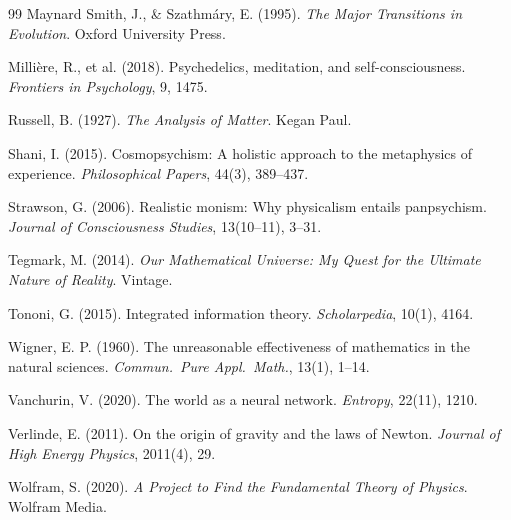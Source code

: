 \documentclass[11pt,a4paper]{article}
\theoremstyle{definition}
\theoremstyle{plain}
\theoremstyle{remark}
\begin{document}
\begin{thebibliography}{99}
 Maynard Smith, J., \& Szathm\'ary, E. (1995). \textit{The Major Transitions in Evolution}. Oxford University Press.

 Milli\`ere, R., et al. (2018). Psychedelics, meditation, and self-consciousness. \textit{Frontiers in Psychology}, 9, 1475.

 Russell, B. (1927). \textit{The Analysis of Matter}. Kegan Paul.

 Shani, I. (2015). Cosmopsychism: A holistic approach to the metaphysics of experience. \textit{Philosophical Papers}, 44(3), 389--437.

 Strawson, G. (2006). Realistic monism: Why physicalism entails panpsychism. \textit{Journal of Consciousness Studies}, 13(10--11), 3--31.

 Tegmark, M. (2014). \textit{Our Mathematical Universe: My Quest for the Ultimate Nature of Reality}. Vintage.

 Tononi, G. (2015). Integrated information theory. \textit{Scholarpedia}, 10(1), 4164.

 Wigner, E. P. (1960). The unreasonable effectiveness of mathematics in the natural sciences. \textit{Commun.\ Pure Appl.\ Math.}, 13(1), 1--14.

 Vanchurin, V. (2020). The world as a neural network. \textit{Entropy}, 22(11), 1210.

 Verlinde, E. (2011). On the origin of gravity and the laws of Newton. \textit{Journal of High Energy Physics}, 2011(4), 29.

 Wolfram, S. (2020). \textit{A Project to Find the Fundamental Theory of Physics}. Wolfram Media.

\end{thebibliography}
\end{document}
